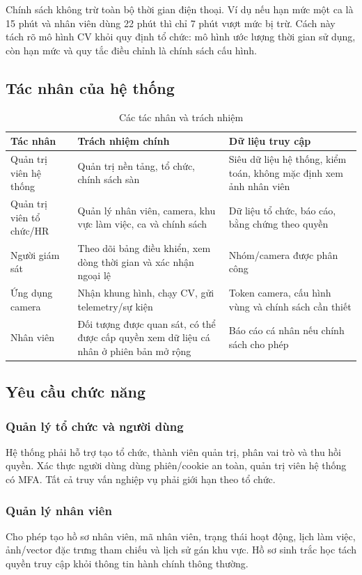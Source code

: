 Chính sách không trừ toàn bộ thời gian điện thoại. Ví dụ nếu hạn mức một ca là 15 phút và nhân viên dùng 22 phút thì chỉ 7 phút vượt mức bị trừ. Cách này tách rõ mô hình CV khỏi quy định tổ chức: mô hình ước lượng thời gian sử dụng, còn hạn mức và quy tắc điều chỉnh là chính sách cấu hình.

\subsection{Tác nhân của hệ thống}
\begin{table}[H]
\centering
\caption{Các tác nhân và trách nhiệm}
\label{tab:actors}
\begin{tabularx}{\textwidth}{p{3.5cm}X X}
\toprule
\textbf{Tác nhân} & \textbf{Trách nhiệm chính} & \textbf{Dữ liệu truy cập}\\
\midrule
Quản trị viên hệ thống & Quản trị nền tảng, tổ chức, chính sách sàn & Siêu dữ liệu hệ thống, kiểm toán, không mặc định xem ảnh nhân viên\\
Quản trị viên tổ chức/HR & Quản lý nhân viên, camera, khu vực làm việc, ca và chính sách & Dữ liệu tổ chức, báo cáo, bằng chứng theo quyền\\
Người giám sát & Theo dõi bảng điều khiển, xem dòng thời gian và xác nhận ngoại lệ & Nhóm/camera được phân công\\
Ứng dụng camera & Nhận khung hình, chạy CV, gửi telemetry/sự kiện & Token camera, cấu hình vùng và chính sách cần thiết\\
Nhân viên & Đối tượng được quan sát, có thể được cấp quyền xem dữ liệu cá nhân ở phiên bản mở rộng & Báo cáo cá nhân nếu chính sách cho phép\\
\bottomrule
\end{tabularx}
\end{table}

\subsection{Yêu cầu chức năng}
\subsubsection{Quản lý tổ chức và người dùng}
Hệ thống phải hỗ trợ tạo tổ chức, thành viên quản trị, phân vai trò và thu hồi quyền. Xác thực người dùng dùng phiên/cookie an toàn, quản trị viên hệ thống có MFA. Tất cả truy vấn nghiệp vụ phải giới hạn theo tổ chức.

\subsubsection{Quản lý nhân viên}
Cho phép tạo hồ sơ nhân viên, mã nhân viên, trạng thái hoạt động, lịch làm việc, ảnh/vector đặc trưng tham chiếu và lịch sử gán khu vực. Hồ sơ sinh trắc học tách quyền truy cập khỏi thông tin hành chính thông thường.

